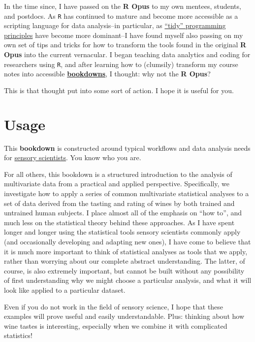 \documentclass[
]{book}
\begin{document}
In the time since, I have passed on the \textbf{R Opus} to my own mentees, students, and postdocs. As \texttt{R} has continued to mature and become more accessible as a scripting language for data analysis--in particular, as \href{https://r4ds.hadley.nz/}{``tidy'' programming principles} have become more dominant--I have found myself also passing on my own set of tips and tricks for how to transform the tools found in the original \textbf{R Opus} into the current vernacular. I began teaching data analytics and coding for researchers using \texttt{R}, and after learning how to (clumsily) transform my course notes into accessible \textbf{\href{https://bookdown.org/yihui/bookdown/}{bookdowns}}, I thought: why not the \textbf{R Opus}?

This is that thought put into some sort of action. I hope it is useful for you.

\section*{Usage}\label{usage}

This \textbf{bookdown} is constructed around typical workflows and data analysis needs for \href{https://en.wikipedia.org/wiki/Sensory_analysis}{sensory scientists}. You know who you are.

For all others, this bookdown is a structured introduction to the analysis of multivariate data from a practical and applied perspective. Specifically, we investigate how to apply a series of common multivariate statistical analyses to a set of data derived from the tasting and rating of wines by both trained and untrained human subjects. I place almost all of the emphasis on ``how to'', and much less on the statistical theory behind these approaches. As I have spent longer and longer using the statistical tools sensory scientists commonly apply (and occasionally developing and adapting new ones), I have come to believe that it is much more important to think of statistical analyses as tools that we apply, rather than worrying about our complete abstract understanding. The latter, of course, is also extremely important, but cannot be built without any possibility of first understanding why we might choose a particular analysis, and what it will look like applied to a particular dataset.

Even if you do not work in the field of sensory science, I hope that these examples will prove useful and easily understandable. Plus: thinking about how wine tastes is interesting, especially when we combine it with complicated statistics!
\end{document}
